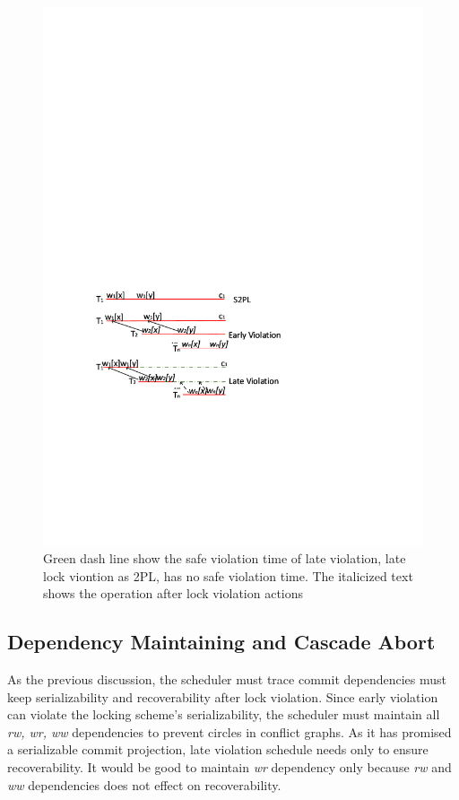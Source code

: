 \documentclass[conference]{IEEEtran}
\begin{document}
\begin{figure}[tbp]
  \centerline{\includegraphics[scale=0.7]{figure/lock_violation_safe.pdf}}
  \caption
  {Green dash line show the safe violation time of late violation, late lock viontion as 2PL, has no safe violation time. 
The italicized text shows the operation after lock violation actions}
\label{fig:lock_violation_safe}
\end{figure}

\subsection{Dependency Maintaining and Cascade Abort}
As the previous discussion,
the scheduler must trace commit dependencies must keep serializability and recoverability after lock violation.
Since early violation can violate the locking scheme's serializability, the scheduler must maintain all \emph{rw, wr, ww} dependencies to prevent circles in conflict graphs.
As it has promised a serializable commit projection,
late violation schedule needs only to ensure recoverability.
It would be good to maintain \emph{wr} dependency only because
\emph{rw} and \emph{ww} dependencies does not effect on recoverability.
\end{document}
